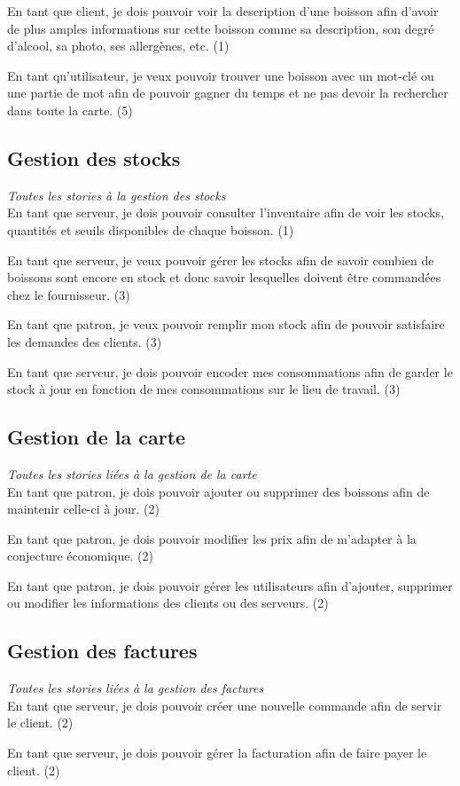 \documentclass[10pt, a4, oneside, headings=normal]{scrartcl}
\begin{document}
En tant que client, je dois pouvoir voir la description d'une boisson afin d'avoir de plus amples informations sur cette boisson comme sa description, son degré d'alcool, sa photo, ses allergènes, etc. (1)

En tant qu'utilisateur, je veux pouvoir trouver une boisson avec un mot-clé ou une partie de mot afin de pouvoir gagner du temps et ne pas devoir la rechercher dans toute la carte. (5)

\subsection{Gestion des stocks}
\emph{Toutes les stories à la gestion des stocks}
\\

En tant que serveur, je dois pouvoir consulter l'inventaire afin de voir les stocks, quantités et seuils disponibles de chaque boisson. (1)

En tant que serveur, je veux pouvoir gérer les stocks afin de savoir combien de boissons sont encore en stock et donc savoir lesquelles doivent être commandées chez le fournisseur. (3)

En tant que patron, je veux pouvoir remplir mon stock afin de pouvoir satisfaire les demandes des clients. (3)

En tant que serveur, je dois pouvoir encoder mes consommations afin de garder le stock à jour en fonction de mes consommations sur le lieu de travail. (3)

\subsection{Gestion de la carte}
\emph{Toutes les stories liées à la gestion de la carte}
\\

En tant que patron, je dois pouvoir ajouter ou supprimer des boissons afin de maintenir celle-ci à jour. (2)

En tant que patron, je dois pouvoir modifier les prix afin de m'adapter à la conjecture économique. (2)

En tant que patron, je dois pouvoir gérer les utilisateurs afin d'ajouter, supprimer ou modifier les informations des clients ou des serveurs. (2)

\subsection{Gestion des factures}
\emph{Toutes les stories liées à la gestion des factures}
\\

En tant que serveur, je dois pouvoir créer une nouvelle commande afin de servir le client. (2)

En tant que serveur, je dois pouvoir gérer la facturation afin de faire payer le client. (2)
\end{document}

